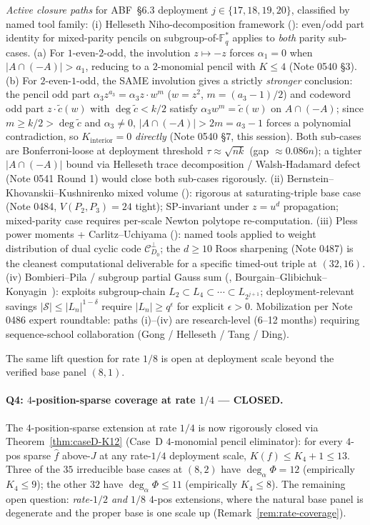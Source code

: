 \documentclass[11pt]{article}
\theoremstyle{definition}
\theoremstyle{remark}
\newcommand{\FF}{\mathbb{F}}
\begin{document}
\emph{Active closure paths} for ABF~\S 6.3 deployment $j \in
\{17, 18, 19, 20\}$, classified by named tool family:
(i) Helleseth Niho-decomposition framework (\cite{HellesethKumar1998}):
even/odd part identity for mixed-parity pencils on subgroup-of-$\FF_q^*$
applies to \emph{both} parity sub-cases. (a) For $1$-even-$2$-odd, the
involution $z \mapsto -z$ forces $\alpha_1 = 0$ when $|A \cap (-A)| > a_1$,
reducing to a $2$-monomial pencil with $K \leq 4$ (Note 0540 §3).
(b) For $2$-even-$1$-odd, the SAME involution gives a strictly
\emph{stronger} conclusion: the pencil odd part $\alpha_3 z^{a_3} =
\alpha_3 z \cdot w^m$ ($w = z^2$, $m = (a_3-1)/2$) and codeword odd part
$z \cdot \tilde c(w)$ with $\deg \tilde c < k/2$ satisfy
$\alpha_3 w^m = \tilde c(w)$ on $A \cap (-A)$; since $m \geq k/2 > \deg \tilde c$
and $\alpha_3 \neq 0$, $|A \cap (-A)| > 2m = a_3 - 1$ forces a polynomial
contradiction, so $K_\mathrm{interior} = 0$ \emph{directly} (Note 0540 §7,
this session). Both sub-cases are Bonferroni-loose at deployment threshold
$\tau \approx \sqrt{nk}$ (gap $\approx 0.086 n$); a tighter $|A \cap (-A)|$
bound via Helleseth trace decomposition / Walsh-Hadamard defect (Note 0541
Round 1) would close both sub-cases rigorously.
(ii) Bernstein--Khovanskii--Kushnirenko mixed volume
(\cite{Bernstein1975}): rigorous at saturating-triple base case
(Note 0484, $V(P_2, P_3) = 24$ tight); SP-invariant under
$z = u^d$ propagation; mixed-parity case requires per-scale Newton
polytope re-computation.
(iii) Pless power moments + Carlitz--Uchiyama
(\cite[Ch.~5]{MacWilliamsSloane1977}): named tools applied to weight
distribution of dual cyclic code $\mathcal{C}_{D_0}^\perp$; the
$d \geq 10$ Roos sharpening (Note 0487) is the cleanest computational
deliverable for a specific timed-out triple at $(32, 16)$.
(iv) Bombieri--Pila / subgroup partial Gauss sum
(\cite{BombieriPila}, Bourgain--Glibichuk--Konyagin~\cite{BGK2006}):
exploits subgroup-chain $L_2 \subset L_4 \subset \cdots \subset L_{2^{j+1}}$;
deployment-relevant savings $|\mathcal{S}| \leq |L_n|^{1 - \delta}$
require $|L_n| \geq q^\epsilon$ for explicit $\epsilon > 0$.
Mobilization per Note 0486 expert roundtable: paths (i)--(iv) are
research-level (6--12 months) requiring sequence-school
collaboration (Gong / Helleseth / Tang / Ding).

The same lift question for rate $1/8$ is open at deployment scale
beyond the verified base panel $(8, 1)$.

\paragraph{Q4: $4$-position-sparse coverage at rate $1/4$ --- CLOSED.}
The $4$-position-sparse extension at rate $1/4$ is now rigorously
closed via Theorem~\ref{thm:caseD-K12} (Case~D $4$-monomial pencil
eliminator): for every $4$-pos sparse $\hat f$ above-$J$ at any
rate-$1/4$ deployment scale, $K(f) \leq K_4 + 1 \leq 13$. Three of the
$35$ irreducible base cases at $(8, 2)$ have $\deg_\alpha \Phi = 12$
(empirically $K_4 \leq 9$); the other $32$ have $\deg_\alpha \Phi \leq 11$
(empirically $K_4 \leq 8$). The remaining open question: \emph{rate-$1/2$
and $1/8$} $4$-pos extensions, where the natural base panel is degenerate
and the proper base is one scale up (Remark~\ref{rem:rate-coverage}).
\end{document}
